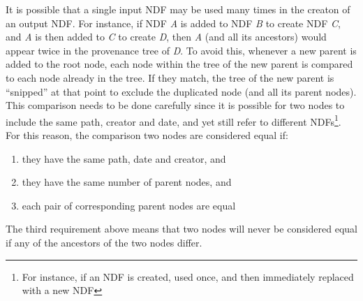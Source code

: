\documentclass[final,authoryear,5p,times,twocolumn]{elsarticle}
\begin{document}
It is possible that a single input NDF may be used many times in the
creaton of an output NDF. For instance, if NDF \emph{A} is added to NDF
\emph{B} to create NDF \emph{C}, and \emph{A} is then added to \emph{C} to create
\emph{D}, then \emph{A} (and all its ancestors) would appear twice in the
provenance tree of \emph{D}. To avoid this, whenever a new parent is added to
the root node, each node within the tree of the new parent is compared to
each node already in the tree. If they match, the tree of the new parent
is ``snipped'' at that point to exclude the duplicated node (and all its
parent nodes). This comparison needs to be done carefully since it is
possible for two nodes to include the same path, creator and date, and
yet still refer to different NDFs\footnote{For instance, if an NDF is
created, used once, and then immediately replaced with a new NDF}. For
this reason, the comparison two nodes are considered equal if:

\begin{enumerate}
\item they have the same path, date and creator, and
\item they have the same number of parent nodes, and
\item each pair of corresponding parent nodes are equal
\end{enumerate}

The third requirement above means that two nodes will never be considered
equal if any of the ancestors of the two nodes differ.
\end{document}
